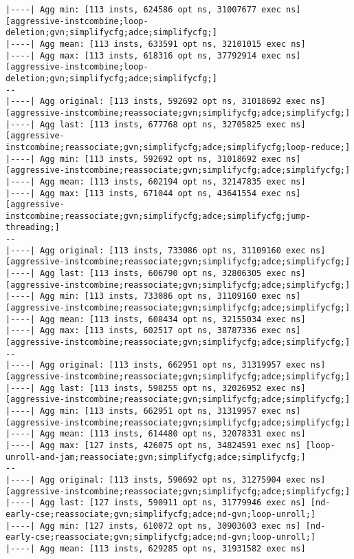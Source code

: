 \documentclass{vldb}
\begin{document}
\begin{lstlisting}
|----| Agg min: [113 insts, 624586 opt ns, 31007677 exec ns] [aggressive-instcombine;loop-deletion;gvn;simplifycfg;adce;simplifycfg;]
|----| Agg mean: [113 insts, 633591 opt ns, 32101015 exec ns]
|----| Agg max: [113 insts, 618316 opt ns, 37792914 exec ns] [aggressive-instcombine;loop-deletion;gvn;simplifycfg;adce;simplifycfg;]
--
|----| Agg original: [113 insts, 592692 opt ns, 31018692 exec ns] [aggressive-instcombine;reassociate;gvn;simplifycfg;adce;simplifycfg;]
|----| Agg last: [113 insts, 677768 opt ns, 32705825 exec ns] [aggressive-instcombine;reassociate;gvn;simplifycfg;adce;simplifycfg;loop-reduce;]
|----| Agg min: [113 insts, 592692 opt ns, 31018692 exec ns] [aggressive-instcombine;reassociate;gvn;simplifycfg;adce;simplifycfg;]
|----| Agg mean: [113 insts, 602194 opt ns, 32147835 exec ns]
|----| Agg max: [113 insts, 671044 opt ns, 43641554 exec ns] [aggressive-instcombine;reassociate;gvn;simplifycfg;adce;simplifycfg;jump-threading;]
--
|----| Agg original: [113 insts, 733086 opt ns, 31109160 exec ns] [aggressive-instcombine;reassociate;gvn;simplifycfg;adce;simplifycfg;]
|----| Agg last: [113 insts, 606790 opt ns, 32806305 exec ns] [aggressive-instcombine;reassociate;gvn;simplifycfg;adce;simplifycfg;]
|----| Agg min: [113 insts, 733086 opt ns, 31109160 exec ns] [aggressive-instcombine;reassociate;gvn;simplifycfg;adce;simplifycfg;]
|----| Agg mean: [113 insts, 608434 opt ns, 32155034 exec ns]
|----| Agg max: [113 insts, 602517 opt ns, 38787336 exec ns] [aggressive-instcombine;reassociate;gvn;simplifycfg;adce;simplifycfg;]
--
|----| Agg original: [113 insts, 662951 opt ns, 31319957 exec ns] [aggressive-instcombine;reassociate;gvn;simplifycfg;adce;simplifycfg;]
|----| Agg last: [113 insts, 598255 opt ns, 32026952 exec ns] [aggressive-instcombine;reassociate;gvn;simplifycfg;adce;simplifycfg;]
|----| Agg min: [113 insts, 662951 opt ns, 31319957 exec ns] [aggressive-instcombine;reassociate;gvn;simplifycfg;adce;simplifycfg;]
|----| Agg mean: [113 insts, 614480 opt ns, 32078331 exec ns]
|----| Agg max: [127 insts, 426075 opt ns, 34824591 exec ns] [loop-unroll-and-jam;reassociate;gvn;simplifycfg;adce;simplifycfg;]
--
|----| Agg original: [113 insts, 590692 opt ns, 31275904 exec ns] [aggressive-instcombine;reassociate;gvn;simplifycfg;adce;simplifycfg;]
|----| Agg last: [127 insts, 590911 opt ns, 31779946 exec ns] [nd-early-cse;reassociate;gvn;simplifycfg;adce;nd-gvn;loop-unroll;]
|----| Agg min: [127 insts, 610072 opt ns, 30903603 exec ns] [nd-early-cse;reassociate;gvn;simplifycfg;adce;nd-gvn;loop-unroll;]
|----| Agg mean: [113 insts, 629285 opt ns, 31931582 exec ns]

\end{lstlisting}
\end{document}
